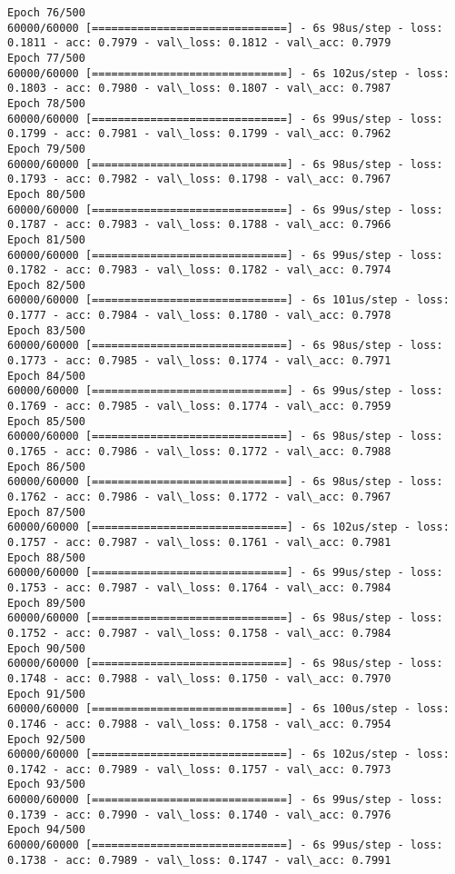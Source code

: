 \documentclass[11pt]{article}
\begin{document}
\begin{Verbatim}[commandchars=\\\{\}]
Epoch 76/500
60000/60000 [==============================] - 6s 98us/step - loss: 0.1811 - acc: 0.7979 - val\_loss: 0.1812 - val\_acc: 0.7979
Epoch 77/500
60000/60000 [==============================] - 6s 102us/step - loss: 0.1803 - acc: 0.7980 - val\_loss: 0.1807 - val\_acc: 0.7987
Epoch 78/500
60000/60000 [==============================] - 6s 99us/step - loss: 0.1799 - acc: 0.7981 - val\_loss: 0.1799 - val\_acc: 0.7962
Epoch 79/500
60000/60000 [==============================] - 6s 98us/step - loss: 0.1793 - acc: 0.7982 - val\_loss: 0.1798 - val\_acc: 0.7967
Epoch 80/500
60000/60000 [==============================] - 6s 99us/step - loss: 0.1787 - acc: 0.7983 - val\_loss: 0.1788 - val\_acc: 0.7966
Epoch 81/500
60000/60000 [==============================] - 6s 99us/step - loss: 0.1782 - acc: 0.7983 - val\_loss: 0.1782 - val\_acc: 0.7974
Epoch 82/500
60000/60000 [==============================] - 6s 101us/step - loss: 0.1777 - acc: 0.7984 - val\_loss: 0.1780 - val\_acc: 0.7978
Epoch 83/500
60000/60000 [==============================] - 6s 98us/step - loss: 0.1773 - acc: 0.7985 - val\_loss: 0.1774 - val\_acc: 0.7971
Epoch 84/500
60000/60000 [==============================] - 6s 99us/step - loss: 0.1769 - acc: 0.7985 - val\_loss: 0.1774 - val\_acc: 0.7959
Epoch 85/500
60000/60000 [==============================] - 6s 98us/step - loss: 0.1765 - acc: 0.7986 - val\_loss: 0.1772 - val\_acc: 0.7988
Epoch 86/500
60000/60000 [==============================] - 6s 98us/step - loss: 0.1762 - acc: 0.7986 - val\_loss: 0.1772 - val\_acc: 0.7967
Epoch 87/500
60000/60000 [==============================] - 6s 102us/step - loss: 0.1757 - acc: 0.7987 - val\_loss: 0.1761 - val\_acc: 0.7981
Epoch 88/500
60000/60000 [==============================] - 6s 99us/step - loss: 0.1753 - acc: 0.7987 - val\_loss: 0.1764 - val\_acc: 0.7984
Epoch 89/500
60000/60000 [==============================] - 6s 98us/step - loss: 0.1752 - acc: 0.7987 - val\_loss: 0.1758 - val\_acc: 0.7984
Epoch 90/500
60000/60000 [==============================] - 6s 98us/step - loss: 0.1748 - acc: 0.7988 - val\_loss: 0.1750 - val\_acc: 0.7970
Epoch 91/500
60000/60000 [==============================] - 6s 100us/step - loss: 0.1746 - acc: 0.7988 - val\_loss: 0.1758 - val\_acc: 0.7954
Epoch 92/500
60000/60000 [==============================] - 6s 102us/step - loss: 0.1742 - acc: 0.7989 - val\_loss: 0.1757 - val\_acc: 0.7973
Epoch 93/500
60000/60000 [==============================] - 6s 99us/step - loss: 0.1739 - acc: 0.7990 - val\_loss: 0.1740 - val\_acc: 0.7976
Epoch 94/500
60000/60000 [==============================] - 6s 99us/step - loss: 0.1738 - acc: 0.7989 - val\_loss: 0.1747 - val\_acc: 0.7991

\end{Verbatim}
\end{document}
